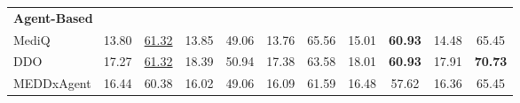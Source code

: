 \documentclass[11pt]{article}
\begin{document}
\begin{table}[t]
\begin{tabular}{lcccccccccc}
		\multicolumn{11}{l}{\cellcolor[HTML]{F2F2F2}\textbf{Agent-Based}}                                                                                                                                                                                             \\
		\multicolumn{1}{l|}{MediQ}                      & 13.80          & \underline{61.32}          & 13.85                & \multicolumn{1}{c|}{49.06}                     & 13.76         & 65.56          & 15.01                   & \multicolumn{1}{c|}{\textbf{60.93}}                   & 14.48                   & 65.45                    \\
		
		\multicolumn{1}{l|}{DDO}                        & 17.27         & \underline{61.32}          & 18.39                  & \multicolumn{1}{c|}{50.94}                     & 17.38         & 63.58          & 18.01                   & \multicolumn{1}{c|}{\textbf{60.93}}                   & 17.91                   & \textbf{70.73}                    \\
		\multicolumn{1}{l|}{MEDDxAgent}                 & 16.44         & 60.38          & 16.02                  & \multicolumn{1}{c|}{49.06}                     & 16.09         & 61.59          & 16.48                   & \multicolumn{1}{c|}{57.62}                   & 16.36                   & 65.45                    \\
		

\end{tabular}
\end{table}
\end{document}

